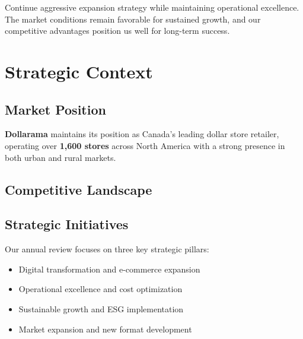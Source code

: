 \documentclass{dollarama}
\begin{document}
\begin{executivesummaryenv}
\vspace{0.8em}
Continue aggressive expansion strategy while maintaining operational excellence. The market conditions remain favorable for sustained growth, and our competitive advantages position us well for long-term success.
\end{executivesummaryenv}


\section{Strategic Context}

\subsection{Market Position}

\textbf{Dollarama} maintains its position as Canada's leading dollar store retailer, operating over \textbf{1,600 stores} across North America with a strong presence in both urban and rural markets.

\subsection{Competitive Landscape}


\subsection{Strategic Initiatives}

Our annual review focuses on three key strategic pillars:
\begin{itemize}
\item Digital transformation and e-commerce expansion
\item Operational excellence and cost optimization
\item Sustainable growth and ESG implementation
\item Market expansion and new format development
\end{itemize}
\end{document}
